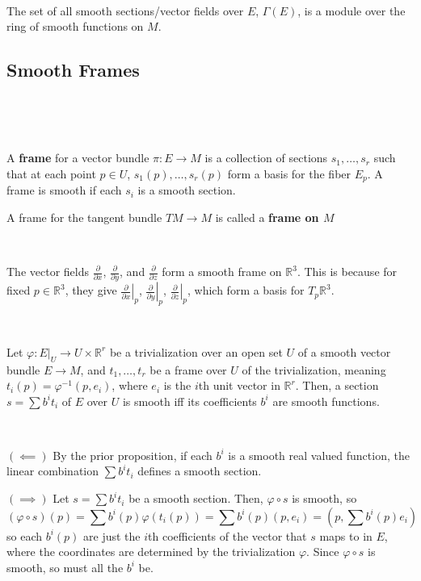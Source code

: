 \documentclass{article}
\begin{document}
\begin{corollary}
  \

  The set of all smooth sections/vector fields over $E$, $\Gamma(E)$, is a module over the ring of smooth functions on $M$.
\end{corollary}

\subsection{Smooth Frames}
\

\begin{definition}[Frames]
  \

  A \textbf{frame} for a vector bundle $\pi: E \to M$ is a collection of sections $s_1, \dots, s_r$ such that at each point $p \in U$, $s_1(p), \dots, s_r(p)$ form a basis for the fiber $E_p$. A frame is smooth if each $s_i$ is a smooth section.

  A frame for the tangent bundle $TM \to M$ is called a \textbf{frame on $M$}
\end{definition}

\begin{example}
  \

  The vector fields $\frac{\partial}{\partial x}$, $\frac{\partial}{\partial y}$, and $\frac{\partial}{\partial z}$ form a smooth frame on $\mathbb{R}^3$. This is because for fixed $p \in \mathbb{R}^3$, they give $\left. \frac{\partial}{\partial x}\right\vert_p$, $\left. \frac{\partial}{\partial y}\right\vert_p$, $\left. \frac{\partial}{\partial z}\right\vert_p$, which form a basis for $T_p \mathbb{R}^3$.
\end{example}

\begin{lemma}
  \

  Let $\varphi: E\vert_U \to U \times \mathbb{R}^r$ be a trivialization over an open set $U$ of a smooth vector bundle $E \to M$, and $t_1, \dots, t_r$ be a frame over $U$ of the trivialization, meaning $t_i(p) = \varphi ^{-1}(p, e_i)$, where $e_i$ is the $i$th unit vector in $\mathbb{R}^r$. Then, a section $s = \sum b^it_i$ of $E$ over $U$ is smooth iff its coefficients $b^i$ are smooth functions.
\end{lemma}

\begin{customproof}
  \

  $(\impliedby)$ By the prior proposition, if each $b^i$ is a smooth real valued function, the linear combination $\sum b^it_i$ defines a smooth section.

  $(\implies)$ Let $s = \sum b^it_i$ be a smooth section. Then, $\varphi \circ s$ is smooth, so $$(\varphi \circ s)(p) = \sum b^i(p)\varphi(t_i(p)) = \sum b^i(p)(p, e_i) = (p, \sum b^i(p)e_i)$$so each $b^i(p)$ are just the $i$th coefficients of the vector that $s$ maps to in $E$, where the coordinates are determined by the trivialization $\varphi$. Since $\varphi \circ s$ is smooth, so must all the $b^i$ be.
\end{customproof}
\end{document}
